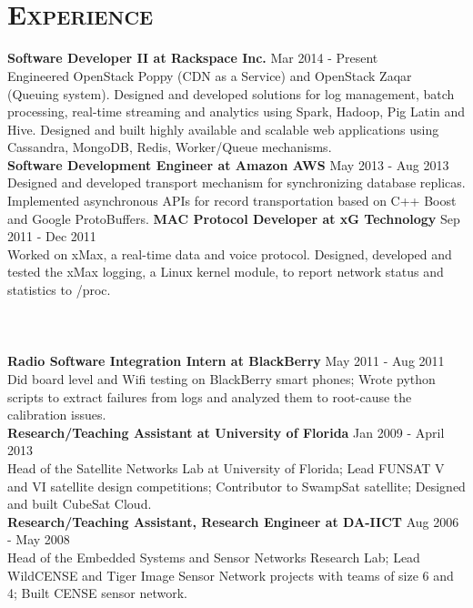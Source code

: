 \begin{resume}
\begin{formatb}
  \\
  \body\\
\end{formatb}

\section{\textsc{Experience}}
\textbf{Software Developer II at Rackspace Inc.} \hfill Mar 2014 - Present\\
Engineered OpenStack Poppy (CDN as a Service) and OpenStack Zaqar (Queuing system). Designed and developed solutions for log management, batch processing, real-time streaming and analytics using Spark, Hadoop, Pig Latin and Hive. Designed and built highly available and scalable web applications using Cassandra, MongoDB, Redis, Worker/Queue mechanisms.\\
\textbf{Software Development Engineer at Amazon AWS} \hfill May 2013 - Aug 2013\\
Designed and developed transport mechanism for synchronizing database replicas. Implemented asynchronous APIs for record transportation based on C++ Boost and Google ProtoBuffers.
\textbf{MAC Protocol Developer at xG Technology} \hfill Sep 2011 - Dec 2011\\
Worked on xMax, a real-time data and voice protocol. Designed, developed and tested the xMax logging, a Linux kernel module, to report network status and statistics to /proc.\\ \\ \\ \\
\textbf{Radio Software Integration Intern at BlackBerry} \hfill May 2011 - Aug 2011\\
Did board level and Wifi testing on BlackBerry smart phones; Wrote python scripts to extract failures from logs and analyzed them to root-cause the calibration issues.\\
\textbf{Research/Teaching Assistant at University of Florida} \hfill Jan 2009 - April 2013\\
Head of the Satellite Networks Lab at University of Florida; Lead FUNSAT V and VI satellite design competitions; Contributor to SwampSat satellite; Designed and built CubeSat Cloud.\\
\textbf{Research/Teaching Assistant, Research Engineer at DA-IICT} \hfill Aug 2006 - May 2008 \\
Head of the Embedded Systems and Sensor Networks Research Lab; Lead WildCENSE and Tiger Image Sensor Network projects with teams of size 6 and 4; Built CENSE sensor network.


\end{resume}
